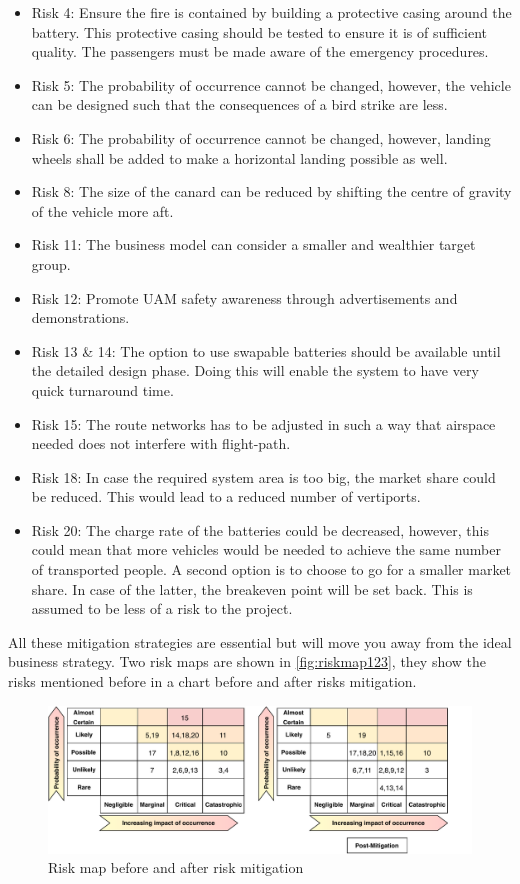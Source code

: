 \begin{itemize}[nolistsep]
    \item Risk 4: Ensure the fire is contained by building a protective casing around the battery. This protective casing should be tested to ensure it is of sufficient quality. The passengers must be made aware of the emergency procedures.
    \item Risk 5: The probability of occurrence cannot be changed, however, the vehicle can be designed such that the consequences of a bird strike are less.
    \item Risk 6: The probability of occurrence cannot be changed, however, landing wheels shall be added to make a horizontal landing possible as well.
    \item Risk 8: The size of the canard can be reduced by shifting the centre of gravity of the vehicle more aft.
    \item Risk 11: The business model can consider a smaller and wealthier target group.
    \item Risk 12: Promote UAM safety awareness through advertisements and demonstrations.
    \item Risk 13 \& 14: The option to use swapable batteries should be available until the detailed design phase. Doing this will enable the system to have very quick turnaround time.
    \item Risk 15: The route networks has to be adjusted in such a way that airspace needed does not interfere with flight-path.
    \item Risk 18: In case the required system area is too big, the market share could be reduced. This would lead to a reduced number of vertiports.
    \item Risk 20: The charge rate of the batteries could be decreased, however, this could mean that more vehicles would be needed to achieve the same number of transported people. A second option is to choose to go for a smaller market share. In case of the latter, the breakeven point will be set back. This is assumed to be less of a risk to the project.

\end{itemize}

All these mitigation strategies are essential but will move you away from the ideal business strategy. Two risk maps are shown in \autoref{fig:riskmap123}, they show the risks mentioned before in a chart before and after risks mitigation. 

\begin{figure}[H]
    \centering
    \includegraphics[width = \linewidth]{Figures/riskmap.pdf}    
    \caption{Risk map before and after risk mitigation}
    \label{fig:riskmap123}
\end{figure}


